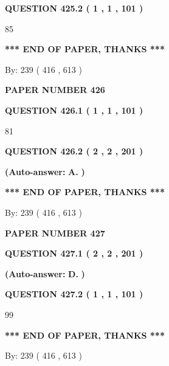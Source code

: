 \documentclass[12pt]{article}
\begin{document}
  
{\textbf{\large{QUESTION
425.2 
 ( 1 , 1 , 101 )
}}}

85
   
   
   
   
\vspace{1.0in} 
{\textbf{\large{ *** END OF PAPER, THANKS *** }}} 
   
   
\hspace{1.0in} By: 
 239 ( 416 ,  613 )
   
   
   
   
\newpage 
\setcounter{page}{ 
   426001 } 
   
   
 {\textbf{ \Large{ PAPER NUMBER  426  }}}
   
   
   
   
  
  
{\textbf{\large{QUESTION
426.1 
 ( 1 , 1 , 101 )
}}}

81
  
  
{\textbf{\large{QUESTION
426.2 
 ( 2 , 2 , 201 )
}}}
 
 
{\textbf{(Auto-answer:}}
{\textbf{\large{
A.}}}
{\textbf{)}}
 
 
   
   
   
   
\vspace{1.0in} 
{\textbf{\large{ *** END OF PAPER, THANKS *** }}} 
   
   
\hspace{1.0in} By: 
 239 ( 416 ,  613 )
   
   
   
   
\newpage 
\setcounter{page}{ 
   427001 } 
   
   
 {\textbf{ \Large{ PAPER NUMBER  427  }}}
   
   
   
   
  
  
{\textbf{\large{QUESTION
427.1 
 ( 2 , 2 , 201 )
}}}
 
 
{\textbf{(Auto-answer:}}
{\textbf{\large{
D.}}}
{\textbf{)}}
 
 
  
  
{\textbf{\large{QUESTION
427.2 
 ( 1 , 1 , 101 )
}}}

99
   
   
   
   
\vspace{1.0in} 
{\textbf{\large{ *** END OF PAPER, THANKS *** }}} 
   
   
\hspace{1.0in} By: 
 239 ( 416 ,  613 )
   
   
   
\end{document}
